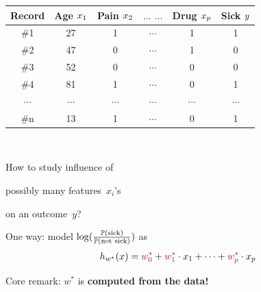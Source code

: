 \documentclass[17pt,aspectratio=169]{beamer}
\begin{document}
\begin{frame}
  \begin{minipage}{0.5\linewidth}

    \vspace{1em}

    \begin{table}
      \centering
      \scriptsize
      \begin{tabular}{c|ccccc}
       Record & \makecell{Age \\[-0.2em] $\color{black}x_1$} & \makecell{Pain \\[-0.2em] $\color{black}x_2$} & \makecell{$\dots$\\[-0.2em] \color{black} $\dots$} & \makecell{Drug \\[-0.2em] $\color{black}x_p$} & \makecell{Sick \\[-0.2em] $\color{black}y$} \\
        \hline
        \#1 & 27 & 1 & $\cdots$ & 1 & 1
        \\
        \#2 & 47 & 0 & $\cdots$ & 1 & 0
        \\
        \#3 & 52 & 0 & $\cdots$ & 0 & 0
        \\
        \#4 & 81 & 1 & $\cdots$ & 0 & 1
        \\
        $\cdots$ & $\cdots$ & $\cdots$ & $\cdots$ & $\cdots$ & $\cdots$
        \\
        \#n & 13 & 1 & $\cdots$ & 0 & 1
      \end{tabular}
    \end{table}
  \end{minipage}~~~~%
  \begin{minipage}{0.45\linewidth}
    How to study influence of

    possibly many features~$x_i$'s

    on an outcome~$y$?
  \end{minipage}

  \pause
  One way: model $\log (\tfrac{\mathbb P(\text{sick})}{\mathbb P(\text{not sick})})$ as
  \begin{align*}
    h_{w^*}(x) =  {\color{purple}w^*_0} + {\color{purple}w^*_1} \cdot x_1 + \cdots + {\color{purple}w^*_p} \cdot x_p
  \end{align*}

  \pause

  Core remark: $w^*$ is \bfseries{\color{purple} computed from the data}!

\end{frame}
\end{document}
